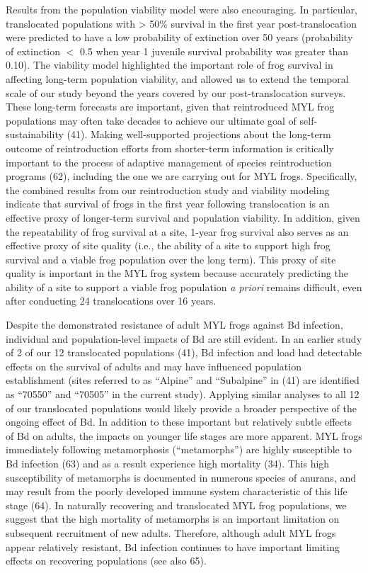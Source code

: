 \documentclass[9pt,twocolumn,twoside,lineno]{pnas-new}
\begin{document}
Results from the population viability model were also encouraging. In
particular, translocated populations with \textgreater{} 50\% survival
in the first year post-translocation were predicted to have a low
probability of extinction over 50 years (probability of extinction \(<\)
0.5 when year 1 juvenile survival probability was greater than 0.10).
The viability model highlighted the important role of frog survival in
affecting long-term population viability, and allowed us to extend the
temporal scale of our study beyond the years covered by our
post-translocation surveys. These long-term forecasts are important,
given that reintroduced MYL frog populations may often take decades to
achieve our ultimate goal of self-sustainability (41). Making
well-supported projections about the long-term outcome of reintroduction
efforts from shorter-term information is critically important to the
process of adaptive management of species reintroduction programs (62),
including the one we are carrying out for MYL frogs. Specifically, the
combined results from our reintroduction study and viability modeling
indicate that survival of frogs in the first year following
translocation is an effective proxy of longer-term survival and
population viability. In addition, given the repeatability of frog
survival at a site, 1-year frog survival also serves as an effective
proxy of site quality (i.e., the ability of a site to support high frog
survival and a viable frog population over the long term). This proxy of
site quality is important in the MYL frog system because accurately
predicting the ability of a site to support a viable frog population
\emph{a priori} remains difficult, even after conducting 24
translocations over 16 years.

Despite the demonstrated resistance of adult MYL frogs against Bd
infection, individual and population-level impacts of Bd are still
evident. In an earlier study of 2 of our 12 translocated populations
(41), Bd infection and load had detectable effects on the survival of
adults and may have influenced population establishment (sites referred
to as ``Alpine'' and ``Subalpine'' in (41) are identified as ``70550''
and ``70505'' in the current study). Applying similar analyses to all 12
of our translocated populations would likely provide a broader
perspective of the ongoing effect of Bd. In addition to these important
but relatively subtle effects of Bd on adults, the impacts on younger
life stages are more apparent. MYL frogs immediately following
metamorphosis (``metamorphs'') are highly susceptible to Bd infection
(63) and as a result experience high mortality (34). This high
susceptibility of metamorphs is documented in numerous species of
anurans, and may result from the poorly developed immune system
characteristic of this life stage (64). In naturally recovering and
translocated MYL frog populations, we suggest that the high mortality of
metamorphs is an important limitation on subsequent recruitment of new
adults. Therefore, although adult MYL frogs appear relatively resistant,
Bd infection continues to have important limiting effects on recovering
populations (see also 65).
\end{document}
